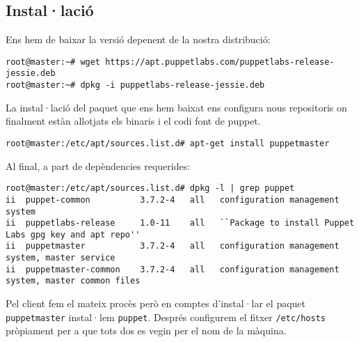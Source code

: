 \documentclass[a4paper]{article}
\begin{document}

\subsection{Instal·lació}
Ens hem de baixar la versió depenent de la nostra distribució:
\begin{verbatim}
root@master:~# wget https://apt.puppetlabs.com/puppetlabs-release-jessie.deb
root@master:~# dpkg -i puppetlabs-release-jessie.deb
\end{verbatim}
La instal·lació del paquet que ens hem baixat ens configura nous repositoris on finalment estàn allotjats els binaris i el codi font de puppet.
\begin{verbatim}
root@master:/etc/apt/sources.list.d# apt-get install puppetmaster
\end{verbatim}
Al final, a part de depèndencies requerides:
\begin{verbatim}
root@master:/etc/apt/sources.list.d# dpkg -l | grep puppet
ii  puppet-common          3.7.2-4   all   configuration management system
ii  puppetlabs-release     1.0-11    all   ``Package to install Puppet Labs gpg key and apt repo''
ii  puppetmaster           3.7.2-4   all   configuration management system, master service
ii  puppetmaster-common    3.7.2-4   all   configuration management system, master common files
\end{verbatim}
Pel client fem el mateix procès però en comptes d'instal·lar el paquet \verb+puppetmaster+ instal·lem \verb+puppet+. Despr\'es configurem el fitxer \verb+/etc/hosts+ pròpiament per a que tots dos es vegin per el nom de la màquina.
\end{document}
